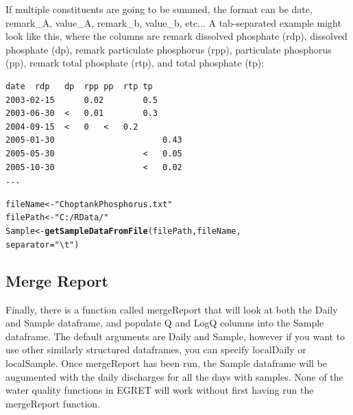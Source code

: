 \documentclass[a4paper,11pt]{article}\usepackage[]{graphicx}\usepackage[]{color}
\makeatletter
\newcommand{\hlstr}[1]{\textcolor[rgb]{0.192,0.494,0.8}{#1}}%
\newcommand{\hlstd}[1]{\textcolor[rgb]{0.345,0.345,0.345}{#1}}%
\newcommand{\hlkwb}[1]{\textcolor[rgb]{0.69,0.353,0.396}{#1}}%
\newcommand{\hlkwc}[1]{\textcolor[rgb]{0.333,0.667,0.333}{#1}}%
\newcommand{\hlkwd}[1]{\textcolor[rgb]{0.737,0.353,0.396}{\textbf{#1}}}%
\newenvironment{kframe}{%
 \def\at@end@of@kframe{}%
 \ifinner\ifhmode%
  \def\at@end@of@kframe{\end{minipage}}%
  \begin{minipage}{\columnwidth}%
 \fi\fi%
 \def\FrameCommand##1{\hskip\@totalleftmargin \hskip-\fboxsep
 \colorbox{shadecolor}{##1}\hskip-\fboxsep
     \hskip-\linewidth \hskip-\@totalleftmargin \hskip\columnwidth}%
 \MakeFramed {\advance\hsize-\width
   \@totalleftmargin\z@ \linewidth\hsize
   \@setminipage}}%
 {\par\unskip\endMakeFramed%
 \at@end@of@kframe}
\newenvironment{knitrout}{}{} %
\makeatother
\begin{document}
If multiple constituents are going to be summed, the format can be date, remark\_A, value\_A, remark\_b, value\_b, etc... A tab-separated example might look like this, where the columns are remark dissolved phosphate (rdp), dissolved phosphate (dp), remark particulate phosphorus (rpp), particulate phosphorus (pp), remark total phosphate (rtp), and total phosphate (tp):
\begin{verbatim}
date  rdp	dp	rpp	pp	rtp	tp
2003-02-15		0.02		0.5		
2003-06-30	<	0.01		0.3		
2004-09-15	<	0	<	0.2		
2005-01-30						0.43
2005-05-30					<	0.05
2005-10-30					<	0.02
...
\end{verbatim}

\begin{knitrout}
\color{fgcolor}\begin{kframe}
\begin{alltt}
\hlstd{fileName} \hlkwb{<-} \hlstr{"ChoptankPhosphorus.txt"}
\hlstd{filePath} \hlkwb{<-}  \hlstr{"C:/RData/"}
\hlstd{Sample} \hlkwb{<-} \hlkwd{getSampleDataFromFile}\hlstd{(filePath,fileName,}
                                \hlkwc{separator}\hlstd{=}\hlstr{"\textbackslash{}t"}\hlstd{)}
\end{alltt}
\end{kframe}
\end{knitrout}



\FloatBarrier

\subsection{Merge Report}
Finally, there is a function called mergeReport that will look at both the Daily and Sample dataframe, and populate Q and LogQ columns into the Sample dataframe. The default arguments are Daily and Sample, however if you want to use other similarly structured dataframes, you can specify localDaily or localSample. Once mergeReport has been run, the Sample dataframe will be augumented with the daily discharges for all the days with samples.  None of the water quality functions in EGRET will work without first having run the mergeReport function.
\end{document}
